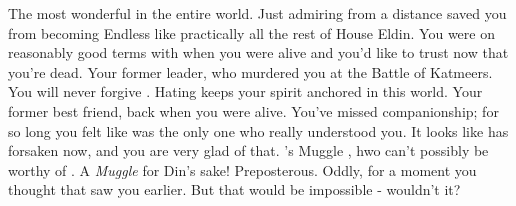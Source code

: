 \documentclass[char]{Katmeers}
\begin{document}
\begin{itemz}[Notes]
	\item 
\end{itemz}

\begin{contacts}
	\contact{\cHermione{}} The most wonderful \cHermione{\human} in the entire world. Just admiring \cHermione{\them} from a distance saved you from becoming Endless like practically all the rest of House Eldin.
	\contact{\cCrabbe{}} You were on reasonably good terms with \cCrabbe{} when you were alive and you'd like to trust \cCrabbe{\them} now that you're dead.
	\contact{\cMalfoy{}} Your former leader, who murdered you at the Battle of Katmeers. You will never forgive \cMalfoy{\them}. Hating \cMalfoy{\formal} keeps your spirit anchored in this world.
	\contact{\cGoyle{}} Your former best friend, back when you were alive. You've missed \cGoyle{\their} companionship; for so long you felt like \cGoyle{\they} was the only one who really understood you. It looks like \cGoyle{\they} has forsaken \cMalfoy{\formal} now, and you are very glad of that.
	\contact{\cHarry{\MYname}} \cHermione{}'s Muggle \cHarry{\spouse}, hwo can't possibly be worthy of \cHermione{\them}. A \emph{Muggle} for Din's sake! Preposterous. Oddly, for a moment you thought that \cHarry{\they} saw you earlier. But that would be impossible - wouldn't it?
\end{contacts}
\end{document}
